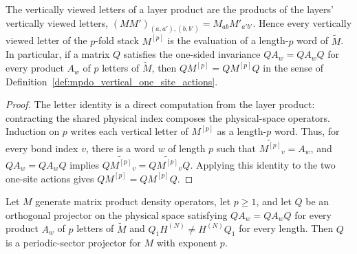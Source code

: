 \begin{lemma}
    \label{thm:mpo_stacked_vertical_letters}
    \leanok
    The vertically viewed letters of a layer product are the products of the
    layers' vertically viewed letters,
    $(MM')_{(a,a'),(b,b')}=M_{ab}M'_{a'b'}$. Hence every vertically viewed
    letter of the $p$-fold stack $M^{[p]}$ is the evaluation of a length-$p$
    word of $\widetilde M$. In particular, if a matrix $Q$ satisfies the
    one-sided invariance $QA_w=QA_wQ$ for every product $A_w$ of $p$ letters
    of $\widetilde M$, then $QM^{[p]}=QM^{[p]}Q$ in the sense of
    Definition~\ref{def:mpdo_vertical_one_site_actions}.
\end{lemma}

\begin{proof}
    \leanok
    The letter identity is a direct computation from the layer product:
    contracting the shared physical index composes the physical-space
    operators. Induction on $p$ writes each vertical letter of $M^{[p]}$ as
    a length-$p$ word. Thus, for every bond index $v$, there is a word $w$
    of length $p$ such that $\widetilde{M^{[p]}}_v=A_w$, and
    $QA_w=QA_wQ$ implies
    $Q\widetilde{M^{[p]}}_v=Q\widetilde{M^{[p]}}_vQ$.
    Applying this identity to the two one-site actions gives
    $QM^{[p]}=QM^{[p]}Q$.
\end{proof}

\begin{definition}
    \label{def:mpdo_periodic_sector_projector_of_cyclic}
    \leanok
    Let $M$ generate matrix product density operators, let $p\ge 1$, and let
    $Q$ be an orthogonal projector on the physical space satisfying
    $QA_w=QA_wQ$ for every product $A_w$ of $p$ letters of $\widetilde M$
    and $Q_1H^{(N)}\ne H^{(N)}Q_1$ for every length. Then $Q$ is a
    periodic-sector projector for $M$ with exponent $p$.
\end{definition}

